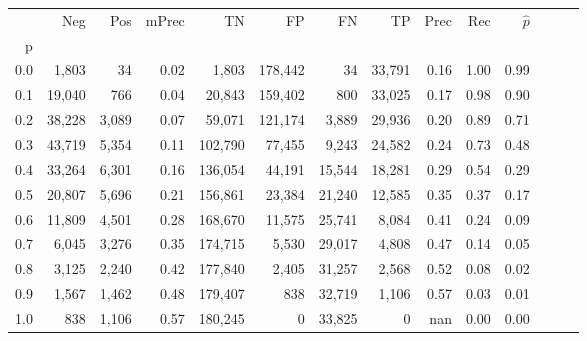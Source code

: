 \begin{tabular}{rrrrrrrrrrrrrr}
\toprule
{} &     Neg &    Pos & mPrec &       TN &       FP &      FN &      TP &  Prec &   Rec & $\hat{p}$ \\
p   &         &        &       &          &          &         &         &       &       &           \\
\midrule
0.0 &   1,803 &     34 &  0.02 &    1,803 &  178,442 &      34 &  33,791 &  0.16 &  1.00 &      0.99 \\
0.1 &  19,040 &    766 &  0.04 &   20,843 &  159,402 &     800 &  33,025 &  0.17 &  0.98 &      0.90 \\
0.2 &  38,228 &  3,089 &  0.07 &   59,071 &  121,174 &   3,889 &  29,936 &  0.20 &  0.89 &      0.71 \\
0.3 &  43,719 &  5,354 &  0.11 &  102,790 &   77,455 &   9,243 &  24,582 &  0.24 &  0.73 &      0.48 \\
0.4 &  33,264 &  6,301 &  0.16 &  136,054 &   44,191 &  15,544 &  18,281 &  0.29 &  0.54 &      0.29 \\
0.5 &  20,807 &  5,696 &  0.21 &  156,861 &   23,384 &  21,240 &  12,585 &  0.35 &  0.37 &      0.17 \\
0.6 &  11,809 &  4,501 &  0.28 &  168,670 &   11,575 &  25,741 &   8,084 &  0.41 &  0.24 &      0.09 \\
0.7 &   6,045 &  3,276 &  0.35 &  174,715 &    5,530 &  29,017 &   4,808 &  0.47 &  0.14 &      0.05 \\
0.8 &   3,125 &  2,240 &  0.42 &  177,840 &    2,405 &  31,257 &   2,568 &  0.52 &  0.08 &      0.02 \\
0.9 &   1,567 &  1,462 &  0.48 &  179,407 &      838 &  32,719 &   1,106 &  0.57 &  0.03 &      0.01 \\
1.0 &     838 &  1,106 &  0.57 &  180,245 &        0 &  33,825 &       0 &   nan &  0.00 &      0.00 \\
\bottomrule
\end{tabular}
